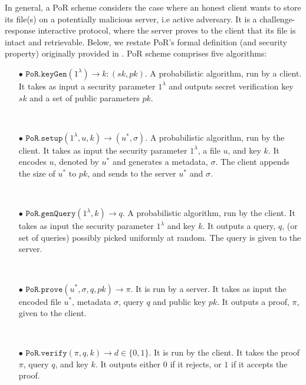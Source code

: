 
In general, a PoR scheme considers the case where an honest client wants to store its file(s) on a  potentially malicious server, i.e active adversary. It is a challenge-response interactive protocol, where the server proves to the client that its file is intact and retrievable. Below, we restate PoR's formal definition (and security property) originally provided in \cite{DBLP:journals/iacr/JuelsK07,DBLP:conf/asiacrypt/ShachamW08}. PoR scheme comprises five algorithms: 

\begin{itemize}
\item[$\bullet$] $\mathtt{PoR.keyGen}(1^{\scriptscriptstyle\lambda})\rightarrow k:(sk,pk)$.  A probabilistic algorithm, run by a client. It takes as input a security parameter  $1^{\scriptscriptstyle\lambda}$ and outputs  secret verification key $sk$ and a set of public parameters $pk$.

\

\item[$\bullet$] $\mathtt{PoR.setup}(1^{\scriptscriptstyle\lambda}, u,k)\rightarrow (u^{\scriptscriptstyle *}, \sigma)$. A probabilistic algorithm, run by the client. It takes as input the security parameter $1^{\scriptscriptstyle\lambda}$,  a file $u$, and key $k$. It encodes $u$, denoted by $u^{\scriptscriptstyle *}$ and generates  a metadata, $\sigma$. The client appends the size of $u^{\scriptscriptstyle *}$ to $pk$, and sends to the server   $u^{\scriptscriptstyle *}$ and  $\sigma$.

\

\item[$\bullet$] $\mathtt{PoR.genQuery}(1^{\scriptscriptstyle\lambda},k)\rightarrow q$. A probabilistic algorithm, run by the client. It takes as input the security parameter  $1^{\scriptscriptstyle\lambda}$ and key $k$. It outputs a  query, $q$, (or set of queries) possibly picked uniformly at random. The query is given to the server. 

\

\item[$\bullet$] $\mathtt{PoR.prove}(u^{\scriptscriptstyle *}, \sigma,q,pk)\rightarrow \pi$. It is run by a server.  It takes as input the encoded file $u^{\scriptscriptstyle *}$, metadata $\sigma$, query $q$ and public key $pk$. It  outputs a proof, $\pi$, given to the client. 

\

\item[$\bullet$] $\mathtt{PoR.verify}(\pi,q,k)\rightarrow d\in\{0,1\}$. It is run by the client. It takes the proof $\pi$,  query $q$, and key $k$. It outputs either $0$ if it rejects,  or $1$ if it accepts the proof. 

\end{itemize}


